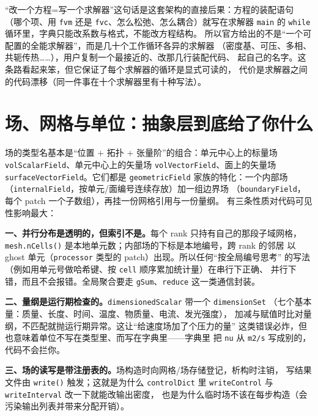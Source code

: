 \documentclass[12pt,a4paper,fontset=fandol]{ctexbook}
\newcommand{\Tp}[1]{\texttt{#1}}
\newcommand{\Bk}{\discretionary{}{}{}}
\begin{document}
``改一个方程=写一个求解器''这句话是这套架构的直接后果：方程的装配语句
（哪个项、用 \Tp{fvm} 还是 \Tp{fvc}、怎么松弛、怎么耦合）就写在求解器
\Tp{main} 的 \Tp{while} 循环里，字典只能改系数与格式，不能改方程结构。
所以官方给出的不是``一个可配置的全能求解器''，而是几十个工作循环各异的求解器
（密度基、可压、多相、共轭传热……），用户复制一个最接近的、改那几行装配代码、
起自己的名字。这条路看起来笨，但它保证了每个求解器的循环是显式可读的，
代价是求解器之间的代码漂移（同一件事在十个求解器里有十种写法）。

\section{场、网格与单位：抽象层到底给了你什么}
\label{sec:ch06-fields}

场的类型名基本是``位置 + 拓扑 + 张量阶''的组合：单元中心上的标量场
\Tp{vol{\Bk}Scalar{\Bk}Field}、单元中心上的矢量场 \Tp{vol{\Bk}Vector{\Bk}Field}、面上的矢量场
\Tp{surface{\Bk}Vector{\Bk}Field}。它们都是 \Tp{geometric{\Bk}Field} 家族的特化：一个内部场
（\Tp{internal{\Bk}Field}，按单元/面编号连续存放）加一组边界场
（\Tp{boundary{\Bk}Field}，每个 patch 一个子数组），再挂一份网格引用与一份量纲。
有三条性质对代码可见性影响最大：

\textbf{一、并行分布是透明的，但索引不是。}每个 rank 只持有自己的那段子域网格，
\Tp{mesh.nCells()} 是本地单元数；内部场的下标是本地编号，跨 rank 的邻居
以 ghost 单元（\Tp{processor} 类型的 patch）出现。所以任何``按全局编号思考''
的写法（例如用单元号做哈希键、按 \Tp{cell} 顺序累加统计量）在串行下正确、
并行下错，而且不会报错。全局聚合要走 \Tp{gSum}、\Tp{reduce} 这一类通信封装。

\textbf{二、量纲是运行期检查的。}\Tp{dimensionedScalar} 带一个 \Tp{dimensionSet}
（七个基本量：质量、长度、时间、温度、物质量、电流、发光强度），
加减与赋值时比对量纲，不匹配就抛运行期异常。这让``给速度场加了个压力的量''
这类错误必炸，但也意味着单位不写在类型里、而写在字典里——字典里
把 \Tp{nu} 从 \Tp{m2/s} 写成别的，代码不会拦你。

\textbf{三、场的读写是带注册表的。}场构造时向网格/场存储登记，析构时注销，
写结果文件由 \Tp{write()} 触发；这就是为什么 \Tp{controlDict} 里
\Tp{writeControl} 与 \Tp{writeInterval} 改一下就能改输出密度，
也是为什么临时场不该在每步构造（会污染输出列表并带来分配开销）。
\end{document}
